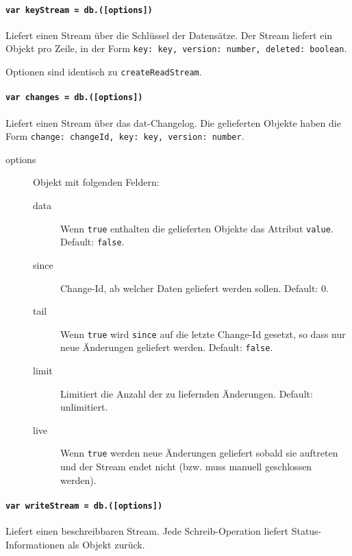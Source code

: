 
\paragraph{\texttt{var keyStream = db.([options])}}
Liefert einen Stream über die Schlüssel der Datensätze. Der Stream liefert ein Objekt pro Zeile, in der Form \texttt{{key: key, version: number, deleted: boolean}}.

Optionen sind identisch zu \texttt{createReadStream}.


\paragraph{\texttt{var changes = db.([options])}}
Liefert einen Stream über das dat-Changelog. Die gelieferten Objekte haben die Form \texttt{{change: changeId, key: key, version: number}}.

\begin{description}
\item[options] Objekt mit folgenden Feldern:
    \begin{description}
    \item[data] Wenn \texttt{true} enthalten die gelieferten Objekte das Attribut \texttt{value}. Default: \texttt{false}.
    \item[since] Change-Id, ab welcher Daten geliefert werden sollen. Default: 0.
    \item[tail] Wenn \texttt{true} wird \texttt{since} auf die letzte Change-Id gesetzt, so dass nur neue Änderungen geliefert werden. Default: \texttt{false}.
    \item[limit] Limitiert die Anzahl der zu liefernden Änderungen. Default: unlimitiert.
    \item[live] Wenn \texttt{true} werden neue Änderungen geliefert sobald sie auftreten und der Stream endet nicht (bzw. muss manuell geschlossen werden).
    \end{description}
\end{description}


\paragraph{\texttt{var writeStream = db.([options])}}
Liefert einen beschreibbaren Stream. Jede Schreib-Operation liefert Status-Informationen als Objekt zurück.

